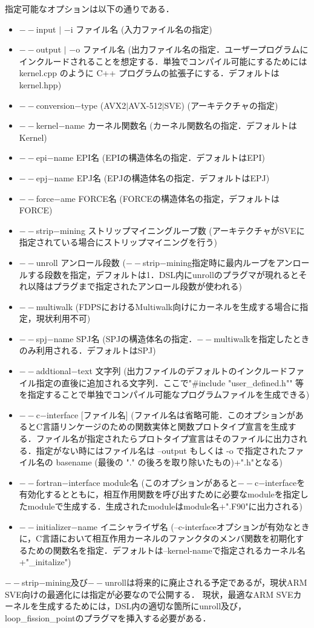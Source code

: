\documentclass{article}
\begin{document}
 指定可能なオプションは以下の通りである．
  \begin{itemize}
   \item $--$input $|$ $-$i ファイル名 (入力ファイル名の指定)
   \item $--$output $|$ $-$o  ファイル名 (出力ファイル名の指定．ユーザープログラムにインクルードされることを想定する．単独でコンパイル可能にするためには kernel.cpp のように C++ プログラムの拡張子にする．デフォルトはkernel.hpp)
   \item $--$conversion$-$type (AVX2$|$AVX-512$|$SVE) (アーキテクチャの指定)
   \item $--$kernel$-$name カーネル関数名 (カーネル関数名の指定．デフォルトはKernel)
   \item $--$epi$-$name EPI名 (EPIの構造体名の指定．デフォルトはEPI)
   \item $--$epj$-$name EPJ名 (EPJの構造体名の指定．デフォルトはEPJ)
   \item $--$force$-$ame FORCE名 (FORCEの構造体名の指定，デフォルトはFORCE)
   \item $--$strip$-$mining ストリップマイニングループ数 (アーキテクチャがSVEに指定されている場合にストリップマイニングを行う)
   \item $--$unroll アンロール段数 ($--$strip$-$mining指定時に最内ループをアンロールする段数を指定，デフォルトは1．DSL内にunrollのプラグマが現れるとそれ以降はプラグまで指定されたアンロール段数が使われる)
   \item $--$multiwalk (FDPSにおけるMultiwalk向けにカーネルを生成する場合に指定，現状利用不可)
   \item $--$spj$-$name SPJ名 (SPJの構造体名の指定．$--$multiwalkを指定したときのみ利用される．デフォルトはSPJ)
   \item $--$addtional$-$text 文字列 (出力ファイルのデフォルトのインクルードファイル指定の直後に追加される文字列．ここで"\#include "user\_defined.h"" 等を指定することで単独でコンパイル可能なプログラムファイルを生成できる)
   \item $--$c$-$interface [ファイル名] (ファイル名は省略可能．このオプションがあるとC言語リンケージのための関数実体と関数プロトタイプ宣言を生成する．ファイル名が指定されたらプロトタイプ宣言はそのファイルに出力される．指定がない時にはファイル名は --output もしくは -o で指定されたファイル名の basename (最後の "." の後ろを取り除いたもの)+".h"となる)
   \item $--$fortran$-$interface module名 (このオプションがあると$--$c$-$interfaceを有効化するとともに，相互作用関数を呼び出すために必要なmoduleを指定したmoduleで生成する．生成されたmoduleはmodule名$+$".F90"に出力される)
   \item $--$initializer$-$name イニシャライザ名 (--c-interfaceオプションが有効なときに，C言語において相互作用カーネルのファンクタのメンバ関数を初期化するための関数名を指定．デフォルトは--kernel-nameで指定されるカーネル名+"\_initalize")
  \end{itemize}
  $--$strip$-$mining及び$--$unrollは将来的に廃止される予定であるが，現状ARM SVE向けの最適化には指定が必要なので公開する．
  現状，最適なARM SVEカーネルを生成するためには，DSL内の適切な箇所にunroll及び，loop\_fission\_pointのプラグマを挿入する必要がある．
\end{document}
